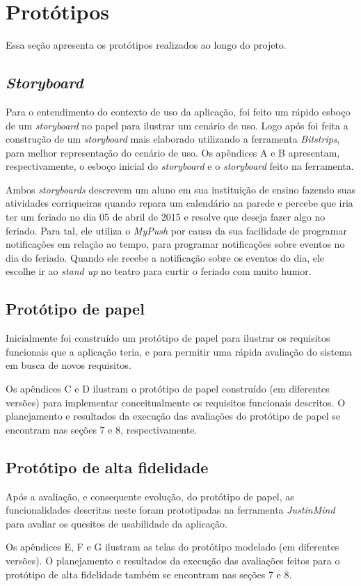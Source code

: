 \chapter{Protótipos}

  Essa seção apresenta os protótipos realizados ao longo do projeto.

  \section{\textit{Storyboard}}
    
    Para o entendimento do contexto de uso da aplicação, foi feito um rápido esboço de um \textit{storyboard} no papel para ilustrar
    um cenário de uso. Logo após foi feita a construção de um \textit{storyboard} mais elaborado utilizando a ferramenta
    \textit{Bitstrips}, para melhor representação do cenário de uso. Os apêndices A e B apresentam, respectivamente,
    o esboço inicial do \textit{storyboard} e o \textit{storyboard} feito na ferramenta.
    
    
    Ambos \textit{storyboards} descrevem um aluno em sua instituição de ensino fazendo suas atividades corriqueiras quando
    repara um calendário na parede e percebe que iria ter um feriado no dia 05 de abril de 2015 e resolve que deseja fazer algo no
    feriado. Para tal, ele utiliza o \textit{MyPush} por causa da sua facilidade de programar notificações em relação ao tempo, para programar
    notificações sobre eventos no dia do feriado. Quando ele recebe a notificação sobre os eventos do dia, ele escolhe ir ao \textit{stand up}
    no teatro para curtir o feriado com muito humor.
    
  \section{Protótipo de papel}

    Inicialmente foi construído um protótipo de papel para ilustrar os requisitos funcionais que a aplicação teria, e para permitir 
    uma rápida avaliação do sistema em busca de novos requisitos.
    
    Os apêndices C e D ilustram o protótipo de papel construído (em diferentes versões) para implementar conceitualmente os
    requisitos funcionais descritos. O planejamento e resultados da execução das avaliações do protótipo de papel se encontram 
    nas seções 7 e 8, respectivamente.
    
    
  \section{Protótipo de alta fidelidade}
  
    Após a avaliação, e consequente evolução, do protótipo de papel, as funcionalidades descritas neste foram prototipadas na ferramenta 
    \textit{JustinMind} para avaliar os quesitos de usabilidade da aplicação.
    
    Os apêndices E, F e G ilustram as telas do protótipo modelado (em diferentes versões). O planejamento e resultados da execução
    das avaliações feitos para o protótipo de alta fidelidade também se encontram nas seções 7 e 8.